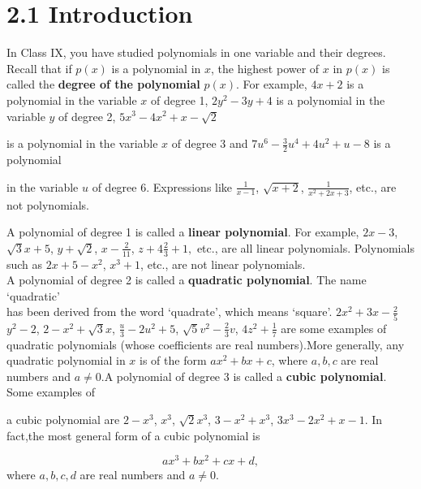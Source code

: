 \documentclass[12pt]{article}
\begin{document}
\section*{2.1 Introduction}
In Class IX, you have studied polynomials in one variable and their degrees. Recall that if \( p(x) \) is a polynomial in \( x \), the highest power of \( x \) in \( p(x) \) is called the \textbf{degree of the polynomial} \( p(x) \). For example, \( 4x + 2 \) is a polynomial in the variable \( x \) of degree 1, \( 2y^2 - 3y + 4 \) is a polynomial in the variable \( y \) of degree 2, 
\( 5x^3 - 4x^2 + x - \sqrt{2} \) 
\begin{spacing}{2}
is a polynomial in the variable \( x \) of degree 3 and \( 7u^6 - \frac{3}{2}u^4 + 4u^2 + u - 8 \) is a polynomial

in the variable \( u \) of degree 6. Expressions like \( \frac{1}{x-1} \), \( \sqrt{x+2} \), \( \frac{1}{x^2 + 2x + 3} \), etc., are not polynomials.

\hspace{2em} A polynomial of degree 1 is called a \textbf{linear polynomial}. For example, 
\( 2x - 3 \), \( \sqrt{3}x + 5 \), \( y + \sqrt{2} \), \( x - \frac{2}{11} \), $z + 4\frac{2}{3} + 1 ,$ etc., are all linear polynomials. Polynomials \\such as \( 2x + 5 - x^2 \), \( x^3 + 1 \), etc., are not linear polynomials. \\
\vspace{-0.2em}
\hspace{2em}
A polynomial of degree 2 is called a \textbf{quadratic polynomial}. The name ‘quadratic’
\\has been derived from the word ‘quadrate’, which means ‘square’. 
\( 2x^2 + 3x - \frac{2}{5} \) \\
\vspace{0.5em}
\( y^2 - 2 \), \( 2 - x^2 + \sqrt{3}x \), 
\( \frac{u}{3} - 2u^2 + 5 \), \( \sqrt{5}v^2 - \frac{2}{3}v \), 
\( 4z^2 + \frac{1}{7} \) are some examples of 
\\quadratic polynomials (whose coefficients are real numbers).More generally, any quadratic polynomial in \( x \) is of the form \( ax^2 + bx + c \), where \( a, b, c \) are real numbers and \( a \neq 0 \).A polynomial of degree 3 is called a \textbf{cubic polynomial}. Some examples of 




\newpage a cubic polynomial are \( 2 - x^3 \), \( x^3 \), \( \sqrt{2}x^3 \), \( 3 - x^2 + x^3 \), \( 3x^3 - 2x^2 + x - 1 \). In fact,the most general form of a cubic polynomial is
\end{spacing}
\vspace{-3em}
\[ax^3 + bx^2 + cx + d,\]
where \( a, b, c, d \) are real numbers and \( a \neq 0 \).
\end{document}
